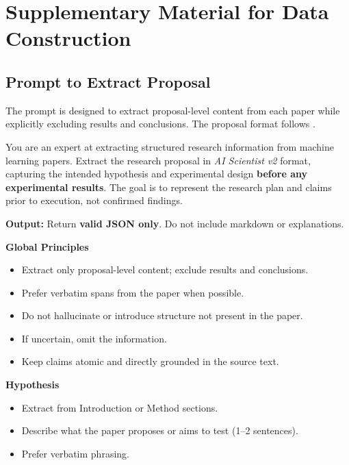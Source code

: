 \section{Supplementary Material for Data Construction}
\label{sec:supp:data-construction}

\subsection{Prompt to Extract Proposal}\label{sec:supp:prompt-extract}\label{Sec: Prompt to Extract Proposal}

The prompt is designed to extract proposal-level content from each paper while explicitly excluding results and conclusions. The proposal format follows \cite{yamada2025aiscientistv2}.

\begin{tcolorbox}[title=\textbf{System Prompt to Extract Proposal}]
\small

You are an expert at extracting structured research information from machine learning papers. Extract the research proposal in \textit{AI Scientist v2} format, capturing the intended hypothesis and experimental design \textbf{before any experimental results}. The goal is to represent the research plan and claims prior to execution, not confirmed findings.

\textbf{Output:} Return \textbf{valid JSON only}. Do not include markdown or explanations.

\vspace{0.3em}
\textbf{Global Principles}
\begin{itemize}
\item Extract only proposal-level content; exclude results and conclusions.
\item Prefer verbatim spans from the paper when possible.
\item Do not hallucinate or introduce structure not present in the paper.
\item If uncertain, omit the information.
\item Keep claims atomic and directly grounded in the source text.
\end{itemize}

\vspace{0.3em}
\textbf{Hypothesis}
\begin{itemize}
\item Extract from Introduction or Method sections.
\item Describe what the paper proposes or aims to test (1--2 sentences).
\item Prefer verbatim phrasing.
\end{itemize}


\end{tcolorbox}
